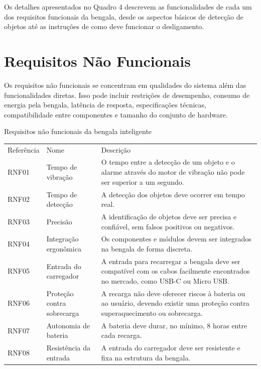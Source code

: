     Os detalhes apresentados no Quadro 4 descrevem as funcionalidades de cada um dos requisitos funcionais da bengala, desde os aspectos básicos de detecção de objetos até as instruções de como deve funcionar o desligamento.

    
\section{Requisitos Não Funcionais}
    Os requisitos não funcionais se concentram em qualidades do sistema além das funcionalidades diretas. Isso pode incluir restrições de desempenho, consumo de energia pela bengala, latência de resposta, especificações técnicas, compatibilidade entre componentes e tamanho do conjunto de hardware.


\begin{quadro}[!ht]    
    \captionsetup{width=1.0\textwidth} %
    \caption{Requisitos não funcionais da bengala inteligente}  
    \renewcommand{\arraystretch}{1.5} %
    \begin{tabular}{p{}p{}p{}} %
        \toprule
        Referência & Nome & Descrição \\
        RNF01 & Tempo de vibração & O tempo entre a detecção de um objeto e o alarme através do motor de vibração não pode ser superior a um segundo.   \\
        RNF02 & Tempo de detecção  & A detecção dos objetos deve ocorrer em tempo real. \\
        RNF03 & Precisão  &  A identificação de objetos deve ser precisa e confiável, sem falsos positivos ou negativos.  \\
        RNF04 & Integração ergonômica  &  Os componentes e módulos devem ser integrados na bengala de forma discreta.  \\
        RNF05 & Entrada do carregador  & A entrada para recarregar a bengala deve ser compatível com os cabos facilmente encontrados no mercado, como USB-C ou Micro USB. \\
        RNF06 & Proteção contra sobrecarga  & A recarga não deve oferecer riscos à bateria ou ao usuário, devendo existir uma proteção contra superaquecimento ou sobrecarga.  \\
        RNF07 & Autonomia de bateria  &  A bateria deve durar, no mínimo, 8 horas entre cada recarga. \\
        RNF08 & Resistência da entrada  & A entrada do carregador deve ser resistente e fixa na estrutura da bengala. \\

\end{tabular}
\end{quadro}
